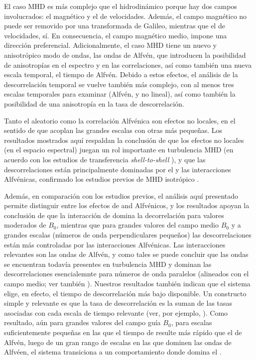 El caso MHD es más complejo que el hidrodinámico porque hay dos campos
involucrados: el magnético y el de velocidades. Además, el campo
magnético no puede ser removido por una transformada de Galileo,
mientras que el de velocidades, sí.  En consecuencia, el campo
magnético medio, impone una dirección preferencial. Adicionalmente, el
caso MHD tiene un nuevo y anisotrópico modo de ondas, las ondas de
Alfvén, que introducen la posibilidad de anisotropías en el espectro y
en las correlaciones, así como también una nueva escala temporal, el
tiempo de Alfvén. Debido a estos efectos, el análisis de la
descorrelación temporal se vuelve también más complejo, con al menos
tres escalas temporales para examinar (Alfvén, \sweeping y no lineal),
así como también la posibilidad de una anisotropía en la tasa de
descorrelación.

Tanto el \sweeping aleatorio como la correlación Alfvénica son efectos
no locales, en el sentido de que acoplan las grandes escalas con otras
más pequeñas. Los resultados mostrados aquí respaldan la conclusión de
que los efectos no locales (en el espacio espectral) juegan un rol
importante en turbulencia MHD (en acuerdo con los estudios de
transferencia \textit{shell-to-shell} \cite{alexakis_turbulent_2007,
  alexakis_anisotropic_2007, teaca_energy_2009, mininni_scale_2011}),
y que las descorrelaciones están principalmente dominadas por el
\sweeping y las interacciones Alfvénicas, confirmado los estudios
previos de MHD isotrópico \cite{servidio_time_2011}.

Además, en comparación con los estudios previos, el análisis aquí
presentado permite distinguir entre los efectos de \sweeping and
Alfvénicos, y los resultados apoyan la conclusión de que la
interacción de \sweeping domina la decorrelación para valores
moderados de $B_0$, mientras que para grandes valores del campo medio
$B_0$ y a grandes escalas (números de onda perpendiculares pequeños)
las descorrelaciones están más controladas por las interacciones
Alfvénicas.  Las interacciones relevantes son las ondas de Alfvén, y
como tales se puede concluir que las ondas se encuentran todavía
presentes en turbulencia MHD y dominan las descorrelaciones
esencialemnte para números de onda paralelos (alineados con el campo
medio; ver también \cite{meyrand_direct_2016,
  meyrand_weak_2015}). Nuestros resultados también indican que el
sistema elige, en efecto, el tiempo de descorrelación más bajo
disponible. Un constructo simple y relevante es que la tasa de
descorrelación es la suman de las tasas asociadas con cada escala de
tiempo relevante (ver, por ejemplo, \cite{pouquet_strong_1976,
  zhou_magnetohydrodynamic_2004}). Como resultado, aún para grandes
valores del campo guía $B_0$, para escalas suficientemente pequeñas en
las que el tiempo de \sweeping resulte más rápido que el de Alfvén,
luego de un gran rango de escalas en las que dominen las ondas de
Alfvéen, el sistema transiciona a un comportamiento donde domina el
\sweeping.


